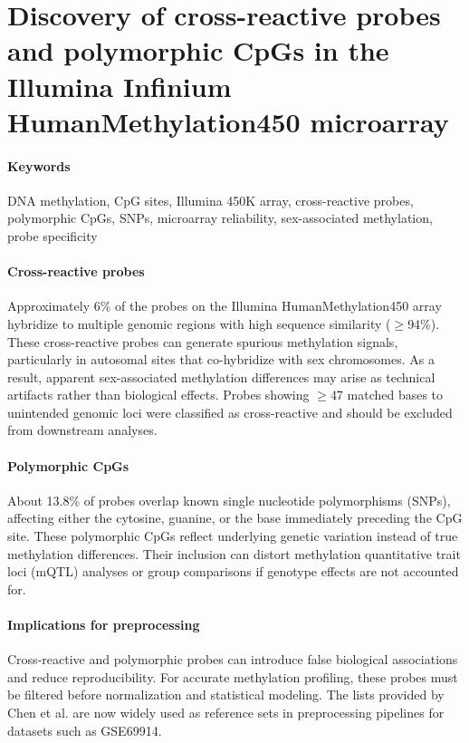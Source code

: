 \documentclass[10pt]{extarticle}
\begin{document}
\section{Discovery of cross-reactive probes and polymorphic CpGs in the Illumina Infinium HumanMethylation450 microarray}

\paragraph{Keywords}
DNA methylation, CpG sites, Illumina 450K array, cross-reactive probes, polymorphic CpGs, SNPs, microarray reliability, sex-associated methylation, probe specificity~\cite{chen2013crossreactive}

\paragraph{Cross-reactive probes}
Approximately 6\% of the probes on the Illumina HumanMethylation450 array hybridize to multiple genomic regions with high sequence similarity ($\geq$94\%). These cross-reactive probes can generate spurious methylation signals, particularly in autosomal sites that co-hybridize with sex chromosomes. As a result, apparent sex-associated methylation differences may arise as technical artifacts rather than biological effects. Probes showing $\geq$47 matched bases to unintended genomic loci were classified as cross-reactive and should be excluded from downstream analyses.

\paragraph{Polymorphic CpGs}
About 13.8\% of probes overlap known single nucleotide polymorphisms (SNPs), affecting either the cytosine, guanine, or the base immediately preceding the CpG site. These polymorphic CpGs reflect underlying genetic variation instead of true methylation differences. Their inclusion can distort methylation quantitative trait loci (mQTL) analyses or group comparisons if genotype effects are not accounted for.

\paragraph{Implications for preprocessing}
Cross-reactive and polymorphic probes can introduce false biological associations and reduce reproducibility. For accurate methylation profiling, these probes must be filtered before normalization and statistical modeling. The lists provided by Chen et al. are now widely used as reference sets in preprocessing pipelines for datasets such as GSE69914.
\end{document}
